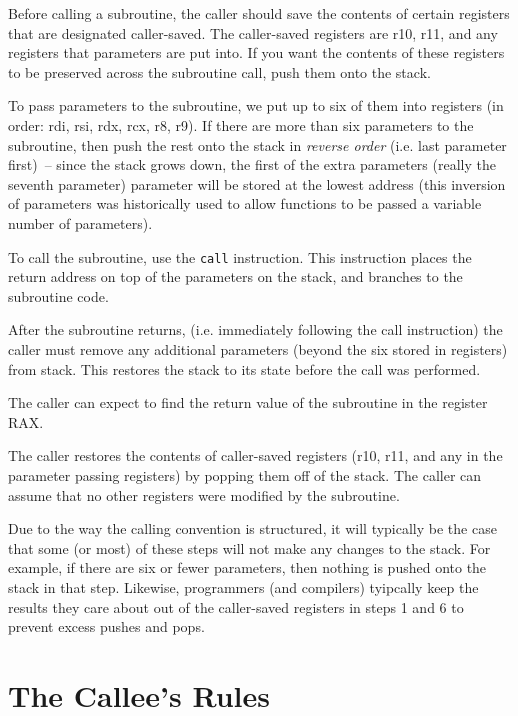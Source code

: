 \begin{numlist}
\item Before calling a subroutine, the caller should save the contents
  of certain registers that are designated caller-saved. The
  caller-saved registers are r10, r11, and any registers that
  parameters are put into. If you want the contents of these registers
  to be preserved across the subroutine call, push them onto the
  stack.
\item To pass parameters to the subroutine, we put up to six of them
  into registers (in order: rdi, rsi, rdx, rcx, r8, r9).  If there are
  more than six parameters to the subroutine, then push the rest onto
  the stack in {\em reverse order} (i.e. last parameter first)~--
  since the stack grows down, the first of the extra parameters
  (really the seventh parameter) parameter will be stored at the
  lowest address (this inversion of parameters was historically used
  to allow functions to be passed a variable number of parameters).
\item To call the subroutine, use the {\tt call} instruction. This
  instruction places the return address on top of the parameters on
  the stack, and branches to the subroutine code.
\item After the subroutine returns, (i.e. immediately following the
  call instruction) the caller must remove any additional parameters
  (beyond the six stored in registers) from stack.  This restores the
  stack to its state before the call was performed.
\item The caller can expect to find the return value of the subroutine
  in the register RAX.
\item The caller restores the contents of caller-saved registers (r10,
  r11, and any in the parameter passing registers) by popping them off
  of the stack. The caller can assume that no other registers were
  modified by the subroutine.
\end{numlist}

Due to the way the calling convention is structured, it will typically
be the case that some (or most) of these steps will not make any
changes to the stack.  For example, if there are six or fewer
parameters, then nothing is pushed onto the stack in that step.
Likewise, programmers (and compilers) tyipcally keep the results they
care about out of the caller-saved registers in steps 1 and 6 to
prevent excess pushes and pops.

\section{The Callee's Rules}

